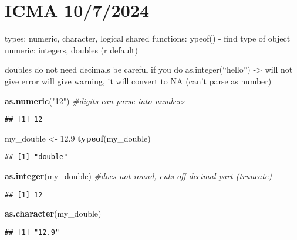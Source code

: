 \documentclass[
]{article}
\newenvironment{Shaded}{\begin{snugshade}}{\end{snugshade}}
\newcommand{\CommentTok}[1]{\textcolor[rgb]{0.56,0.35,0.01}{\textit{#1}}}
\newcommand{\FloatTok}[1]{\textcolor[rgb]{0.00,0.00,0.81}{#1}}
\newcommand{\FunctionTok}[1]{\textcolor[rgb]{0.13,0.29,0.53}{\textbf{#1}}}
\newcommand{\NormalTok}[1]{#1}
\newcommand{\OtherTok}[1]{\textcolor[rgb]{0.56,0.35,0.01}{#1}}
\newcommand{\StringTok}[1]{\textcolor[rgb]{0.31,0.60,0.02}{#1}}
\begin{document}
\section{ICMA 10/7/2024}\label{icma-1072024}

types: numeric, character, logical shared functions: ypeof() - find type
of object numeric: integers, doubles (r default)

doubles do not need decimals be careful if you do as.integer(``hello'')
-\textgreater{} will not give error will give warning, it will convert
to NA (can't parse as number)

\begin{Shaded}
\begin{Highlighting}[]
\FunctionTok{as.numeric}\NormalTok{(}\StringTok{"12"}\NormalTok{) }\CommentTok{\#digits can parse into numbers}
\end{Highlighting}
\end{Shaded}

\begin{verbatim}
## [1] 12
\end{verbatim}

\begin{Shaded}
\begin{Highlighting}[]
\NormalTok{my\_double }\OtherTok{\textless{}{-}} \FloatTok{12.9}
\FunctionTok{typeof}\NormalTok{(my\_double)}
\end{Highlighting}
\end{Shaded}

\begin{verbatim}
## [1] "double"
\end{verbatim}

\begin{Shaded}
\begin{Highlighting}[]
\FunctionTok{as.integer}\NormalTok{(my\_double) }\CommentTok{\#does not round, cuts off decimal part (truncate)}
\end{Highlighting}
\end{Shaded}

\begin{verbatim}
## [1] 12
\end{verbatim}

\begin{Shaded}
\begin{Highlighting}[]
\FunctionTok{as.character}\NormalTok{(my\_double)}
\end{Highlighting}
\end{Shaded}

\begin{verbatim}
## [1] "12.9"
\end{verbatim}
\end{document}
